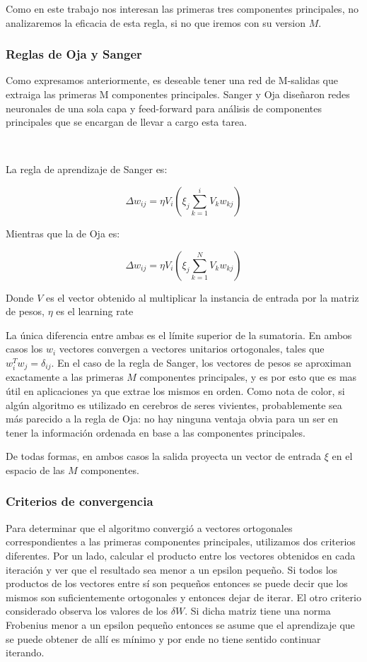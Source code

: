\documentclass[informe.tex]{subfiles}
\begin{document}
	Como en este trabajo nos interesan las primeras tres componentes principales, no analizaremos la eficacia de esta regla, si no que iremos con su version $M$.
      
      \subsubsection{Reglas de Oja y Sanger}
	Como expresamos anteriormente, es deseable tener una red de M-salidas que extraiga las primeras M componentes principales. Sanger y Oja diseñaron redes neuronales de una sola capa y feed-forward para análisis de componentes principales que se encargan de llevar a cargo esta tarea.
	
	~
	
	La regla de aprendizaje de Sanger es:

	$$\Delta w_{ij} = \eta V_i(\xi_j \sum_{k=1}^{i} V_k w_{kj} )$$

	Mientras que la de Oja es:

	$$\Delta w_{ij} = \eta V_i(\xi_j \sum_{k=1}^{N} V_k w_{kj} )$$
	
	Donde $V$ es el vector obtenido al multiplicar la instancia de entrada por la matriz de pesos, $\eta$ es el learning rate 

	La única diferencia entre ambas es el límite superior de la sumatoria. En ambos casos los $w_i$ vectores convergen a vectores unitarios ortogonales, tales que $w^{T}_i w_j = \delta_{ij}$. En el caso de la regla de Sanger, los vectores de pesos se aproximan exactamente a las primeras $M$ componentes principales, y es por esto que es mas \'util en aplicaciones ya que extrae los mismos en orden. Como nota de color, si algún algoritmo es utilizado en cerebros de seres vivientes, probablemente sea más parecido a la regla de Oja: no hay ninguna ventaja obvia para un ser en tener la información ordenada en base a las componentes principales. 

	De todas formas, en ambos casos la salida proyecta un vector de entrada $\xi$ en el espacio de las $M$ componentes.
	
      \subsubsection{Criterios de convergencia}
	Para determinar que el algoritmo convergió a vectores ortogonales correspondientes a las primeras componentes principales, utilizamos dos criterios diferentes. Por un lado, calcular el producto entre los vectores obtenidos en cada iteración y ver que el resultado sea menor a un epsilon pequeño. Si todos los productos de los vectores entre sí son pequeños entonces se puede decir que los mismos son suficientemente ortogonales y entonces dejar de iterar. El otro criterio considerado observa los valores de los $\delta W$. Si dicha matriz tiene una norma Frobenius menor a un epsilon pequeño entonces se asume que el aprendizaje que se puede obtener de allí es mínimo y por ende no tiene sentido continuar iterando.
	
\end{document}
